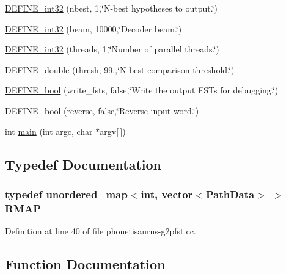 \begin{DoxyCompactItemize}
\hyperlink{phonetisaurus-g2pfst_8cc_a13308827a3e18a8d0364b608ab20cf7e}{D\+E\+F\+I\+N\+E\+\_\+int32} (nbest, 1,\char`\"{}N-\/best hypotheses to output.\char`\"{})
\item 
\hyperlink{phonetisaurus-g2pfst_8cc_a3cac80d4d29c9e0cafae0d3998be0b8b}{D\+E\+F\+I\+N\+E\+\_\+int32} (beam, 10000,\char`\"{}Decoder beam.\char`\"{})
\item 
\hyperlink{phonetisaurus-g2pfst_8cc_afeab31368fb1c474a1a6f742f0a2f868}{D\+E\+F\+I\+N\+E\+\_\+int32} (threads, 1,\char`\"{}Number of parallel threads.\char`\"{})
\item 
\hyperlink{phonetisaurus-g2pfst_8cc_abfa70c089a37e52546c0d8496f3be69d}{D\+E\+F\+I\+N\+E\+\_\+double} (thresh, 99.,\char`\"{}N-\/best comparison threshold.\char`\"{})
\item 
\hyperlink{phonetisaurus-g2pfst_8cc_a67517c8d7c98eb64b2f744d6634b20b5}{D\+E\+F\+I\+N\+E\+\_\+bool} (write\+\_\+fsts, false,\char`\"{}Write the output F\+S\+Ts for debugging.\char`\"{})
\item 
\hyperlink{phonetisaurus-g2pfst_8cc_ac639e1b21126f15316de0872515f81c0}{D\+E\+F\+I\+N\+E\+\_\+bool} (reverse, false,\char`\"{}Reverse input word.\char`\"{})
\item 
int \hyperlink{phonetisaurus-g2pfst_8cc_a0ddf1224851353fc92bfbff6f499fa97}{main} (int argc, char $\ast$argv\mbox{[}$\,$\mbox{]})
\end{DoxyCompactItemize}


\subsection{Typedef Documentation}
\subsubsection[{R\+M\+AP}]{\setlength{\rightskip}{0pt plus 5cm}typedef unordered\+\_\+map$<$int, vector$<${\bf Path\+Data}$>$ $>$ {\bf R\+M\+AP}}\hypertarget{phonetisaurus-g2pfst_8cc_aaed81f2ee40857c2b37f7772067c38ee}{}\label{phonetisaurus-g2pfst_8cc_aaed81f2ee40857c2b37f7772067c38ee}


Definition at line 40 of file phonetisaurus-\/g2pfst.\+cc.



\subsection{Function Documentation}
